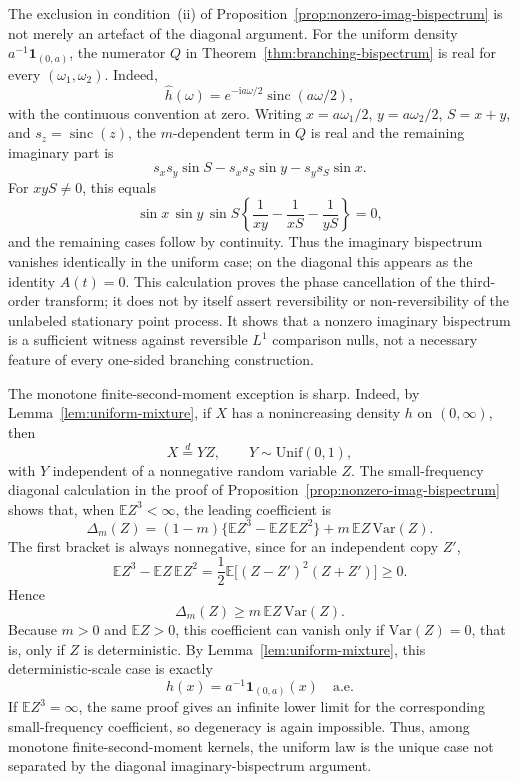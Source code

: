 \documentclass[aap,press]{apt} \volno{00} \partno{00}
\newcommand{\E}{\mathbb{E}}
\renewcommand{\ii}{\mathrm{i}}
\newcommand{\1}{\mathbf{1}}
\numberwithin{equation}{section}
\begin{document}
\begin{rem}\label{rem:uniform-kernel-exception}
The exclusion in condition~(ii) of Proposition~\ref{prop:nonzero-imag-bispectrum} is not merely an artefact of the diagonal argument. For the uniform density $a^{-1}\1_{(0,a)}$, the numerator $Q$ in Theorem~\ref{thm:branching-bispectrum} is real for every $(\omega_1,\omega_2)$. Indeed,
\[
\widehat h(\omega)=e^{-\ii a\omega/2}\operatorname{sinc}(a\omega/2),
\]
with the continuous convention at zero. Writing $x=a\omega_1/2$, $y=a\omega_2/2$, $S=x+y$, and $s_z=\operatorname{sinc}(z)$, the $m$-dependent term in $Q$ is real and the remaining imaginary part is
\[
s_xs_y\sin S-s_xs_S\sin y-s_ys_S\sin x.
\]
For $xyS\ne0$, this equals
\[
\sin x\,\sin y\,\sin S
\left\{\frac1{xy}-\frac1{xS}-\frac1{yS}\right\}=0,
\]
and the remaining cases follow by continuity. Thus the imaginary bispectrum vanishes identically in the uniform case; on the diagonal this appears as the identity $A(t)=0$. This calculation proves the phase cancellation of the third-order transform; it does not by itself assert reversibility or non-reversibility of the unlabeled stationary point process. It shows that a nonzero imaginary bispectrum is a sufficient witness against reversible $L^1$ comparison nulls, not a necessary feature of every one-sided branching construction.

The monotone finite-second-moment exception is sharp. Indeed, by Lemma~\ref{lem:uniform-mixture}, if $X$ has a nonincreasing density $h$ on $(0,\infty)$, then
\[
X\stackrel d=YZ,
\qquad
Y\sim \mathrm{Unif}(0,1),
\]
with $Y$ independent of a nonnegative random variable $Z$. The small-frequency diagonal calculation in the proof of Proposition~\ref{prop:nonzero-imag-bispectrum} shows that, when $\E Z^3<\infty$, the leading coefficient is
\[
\Delta_m(Z)
=
(1-m)\{\E Z^3-\E Z\,\E Z^2\}
+
m\,\E Z\,\mathrm{Var}(Z).
\]
The first bracket is always nonnegative, since for an independent copy $Z'$,
\[
\E Z^3-\E Z\,\E Z^2
=
\frac12\E\big[(Z-Z')^2(Z+Z')\big]\ge0.
\]
Hence
\[
\Delta_m(Z)\ge m\,\E Z\,\mathrm{Var}(Z).
\]
Because $m>0$ and $\E Z>0$, this coefficient can vanish only if $\mathrm{Var}(Z)=0$, that is, only if $Z$ is deterministic. By Lemma~\ref{lem:uniform-mixture}, this deterministic-scale case is exactly
\[
h(x)=a^{-1}\mathbf 1_{(0,a)}(x)
\quad\text{a.e.}
\]
If $\E Z^3=\infty$, the same proof gives an infinite lower limit for the corresponding small-frequency coefficient, so degeneracy is again impossible. Thus, among monotone finite-second-moment kernels, the uniform law is the unique case not separated by the diagonal imaginary-bispectrum argument.
\end{rem}
\end{document}
